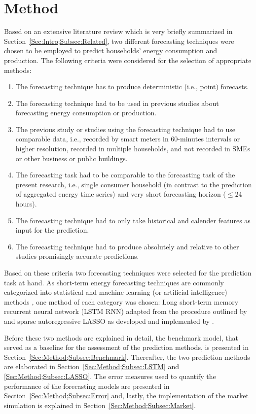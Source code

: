 
\section{Method}\label{Sec:Method}

Based on an extensive literature review which is very briefly summarized in Section~\ref{Sec:Intro;Subsec:Related}, two different forecasting techniques were chosen to be employed to predict households' energy consumption and production. The following criteria were considered for the selection of appropriate methods: 

\begin{enumerate}
    \item The forecasting technique has to produce deterministic (i.e., point) forecasts.
    \item The forecasting technique had to be used in previous studies about forecasting energy consumption or production.
    \item The previous study or studies using the forecasting technique had to use comparable data, i.e., recorded by smart meters in 60-minutes intervals or higher resolution, recorded in multiple households, and not recorded in SMEs or other business or public buildings.
    \item The forecasting task had to be comparable to the forecasting task of the present research, i.e., single consumer household (in contrast to the prediction of aggregated energy time series) and very short forecasting horizon ($\leq 24$ hours).
    \item The forecasting technique had to only take historical and calender features as input for the prediction.
    \item The forecasting technique had to produce absolutely and relative to other studies promisingly accurate predictions.
\end{enumerate}

\noindent Based on these criteria two forecasting techniques were selected for the prediction task at hand. As short-term energy forecasting techniques are commonly categorized into statistical and machine learning (or artificial intelligence) methods \citep{Bansal:2015,Diagne:2013,Gan:2017}, one method of each category was chosen: Long short-term memory recurrent neural network (LSTM RNN) adapted from the procedure outlined by \citet{Shi:2017} and sparse autoregressive LASSO as developed and implemented by \citet{Li:2017}.

Before these two methods are explained in detail, the benchmark model, that served as a baseline for the assessment of the prediction methods, is presented in Section~\ref{Sec:Method;Subsec:Benchmark}. Thereafter, the two prediction methods are elaborated in Section~\ref{Sec:Method;Subsec:LSTM} and \ref{Sec:Method;Subsec:LASSO}. The error measures used to quantify the performance of the forecasting models are presented in Section~\ref{Sec:Method;Subsec:Error} and, lastly, the implementation of the market simulation is explained in Section~\ref{Sec:Method;Subsec:Market}.



